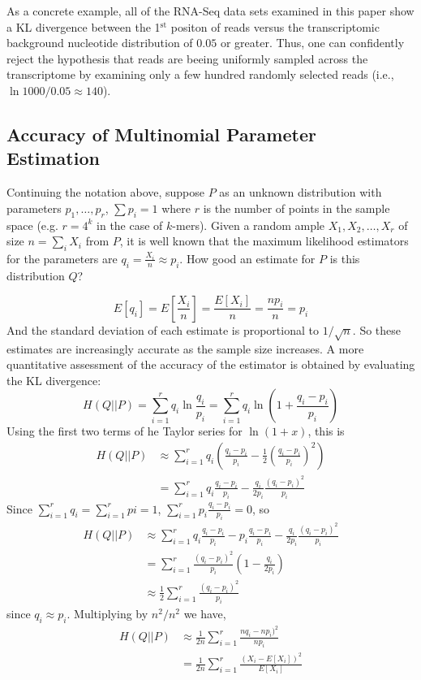 \documentclass[letterpaper]{article}
\begin{document}
As a concrete example, all of the RNA-Seq data sets examined in this paper show
a KL divergence between the 1$^{\text{st}}$ positon of reads versus the
transcriptomic background nucleotide distribution of $0.05$ or greater. Thus,
one can confidently reject the hypothesis that reads are beeing uniformly
sampled across the transcriptome by examining only a few hundred randomly
selected reads (i.e., $\ln 1000 / 0.05 \approx 140$).


\subsection{Accuracy of Multinomial Parameter Estimation}

Continuing the notation above, suppose $P$ as an unknown distribution with
parameters $p_1, \dots, p_r$, $\sum p_i = 1$ where $r$ is the number of points
in the sample space (e.g. $r = 4^{k}$ in the case of $k$-mers). Given a random
ample $X_1, X_2, \dots, X_r$ of size $n = \sum_{i} X_i$ from $P$, it is well
known that the maximum likelihood estimators for the parameters are $q_i =
\frac{X_i}{n} \approx p_i$. How good an estimate for $P$ is this distribution
$Q$?

$$E[q_i] = E\left[\frac{X_i}{n}\right] = \frac{E[X_i]}{n} = \frac{np_i}{n} =
p_i$$
And the standard deviation of each estimate is proportional to $1/\sqrt{n}$. So
these estimates are increasingly accurate as the sample size increases. A more
quantitative assessment of the accuracy of the estimator is obtained by
evaluating the KL divergence:
$$H(Q||P)
= \sum_{i = 1}^{r} q_i \ln \frac{q_i}{p_i}
= \sum_{i = 1}^{r} q_i \ln \left(1 + \frac{q_i - p_i}{p_i} \right) $$
Using the first two terms of he Taylor series for $\ln (1 + x)$, this is
\begin{align*}
H(Q||P) &\approx \sum_{i = 1}^{r} q_i \left( \frac{q_i - p_i}{p_i} -
\frac{1}{2} \left( \frac{q_i - p_i}{p_i} \right)^2 \right ) \\
&= \sum_{i = 1}^{r} q_i \frac{q_i - p_i}{p_i} -
\frac{q_i}{2 p_i} \frac{(q_i - p_i)^2} {p_i}
\end{align*}
Since $\sum_{i = 1}^{r} q_i = \sum_{i = 1}^{r} pi = 1$,
$\sum_{i = 1}^{r} p_i \frac{q_i - p_i}{p_i} = 0$, so
\begin{align*}
H(Q||P) &\approx \sum_{i=1}^{r} q_i \frac{q_i - p_i}{p_i} - p_i \frac{q_i -
p_i}{p_i} - \frac{q_i}{2 p_i} \frac{(q_i - p_i)^2}{p_i} \\
&= \sum_{i=1}^{r} \frac{(q_i - p_i)^2}{p_i}\left(1 - \frac{q_i}{2 p_i}\right) \\
&\approx \frac{1}{2} \sum_{i=1}^{r} \frac{(q_i - p_i)^2}{p_i}
\end{align*}
since $q_i \approx p_i$. Multiplying by $n^2 / n^2$ we have,
\begin{align*}
H(Q||P) &\approx \frac{1}{2n} \sum_{i=1}^{r} \frac{n q_i - n p_i)^2}{n p_i} \\
        &= \frac{1}{2n} \sum_{i=1}^{r} \frac{(X_i - E[X_i])^2}{E[X_i]}
\end{align*}
\end{document}
